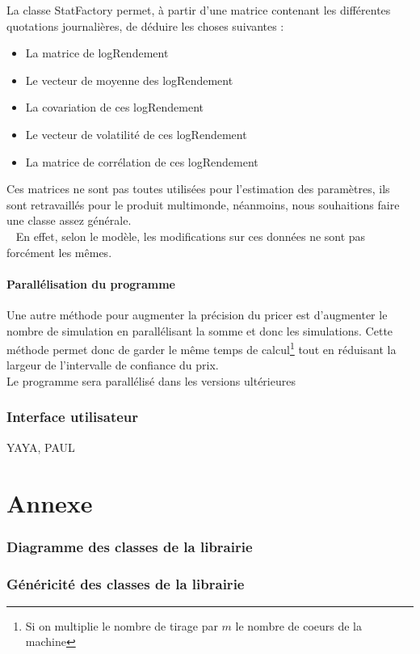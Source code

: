 \documentclass[a4paper,12pt]{article}
\begin{document}

La classe StatFactory permet, à partir d'une matrice contenant les différentes quotations journalières, de déduire les choses suivantes : 
\begin{itemize}
    \item La matrice de logRendement 
    \item Le vecteur de moyenne des logRendement
    \item La covariation de ces logRendement 
    \item Le vecteur de volatilité de ces logRendement 
    \item La matrice de corrélation de ces logRendement
\end{itemize}

Ces matrices ne sont pas toutes utilisées pour l'estimation des paramètres, ils sont retravaillés pour le produit multimonde, néanmoins, nous souhaitions faire une classe assez générale. \\ 
En effet, selon le modèle, les modifications sur ces données ne sont pas forcément les mêmes. 


\subsection{Parallélisation du programme}
Une autre méthode pour augmenter la précision du pricer est d'augmenter le nombre de simulation en parallélisant la somme et donc les simulations. Cette méthode permet donc de garder le même temps de calcul\footnote{Si on multiplie le nombre de tirage par $m$ le nombre de coeurs de la machine} tout en réduisant la largeur de l'intervalle de confiance du prix. \\
Le programme sera parallélisé dans les versions ultérieures
\newpage
\section{Interface utilisateur}
YAYA, PAUL
\part{Annexe}
\section{Diagramme des classes de la librairie}
\label{diagrammeClasse}
\section{Généricité des classes de la librairie}
 
\end{document}
